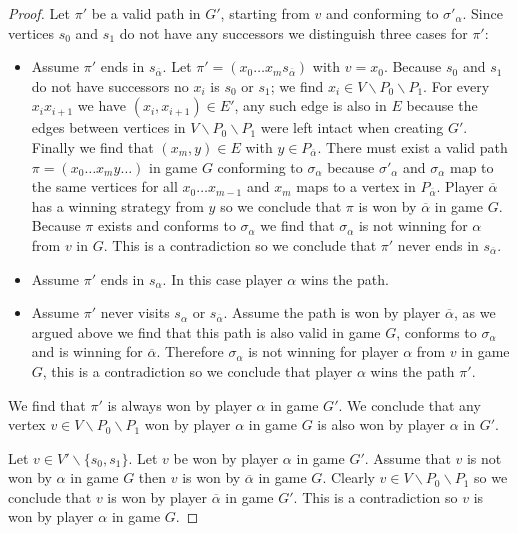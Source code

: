 \begin{lemma}
\begin{proof}
		Let $\pi'$ be a valid path in $G'$, starting from $v$ and conforming to $\sigma'_\alpha$. Since vertices $s_0$ and $s_1$ do not have any successors we distinguish three cases for $\pi'$:
		\begin{itemize}
			\item Assume $\pi'$ ends in $s_{\overline{\alpha}}$. Let $\pi' = (x_0\dots x_m s_{\overline{\alpha}})$ with $v = x_0$. Because $s_0$ and $s_1$ do not have successors no $x_i$ is $s_0$ or $s_1$; we find $x_i \in V\backslash P_0 \backslash P_1$. For every $x_ix_{i+1}$ we have $(x_i,x_{i+1}) \in E'$, any such edge is also in $E$ because the edges between vertices in $V\backslash P_0 \backslash P_1$ were left intact when creating $G'$. Finally we find that $(x_m,y) \in E$ with $y \in P_{\overline{\alpha}}$. There must exist a valid path $\pi = (x_0 \dots x_m y\dots)$ in game $G$ conforming to $\sigma_\alpha$ because $\sigma'_\alpha$ and $\sigma_\alpha$ map to the same vertices for all $x_0\dots x_{m-1}$ and $x_m$ maps to a vertex in $P_{\overline{\alpha}}$. Player $\overline{\alpha}$ has a winning strategy from $y$ so we conclude that $\pi$ is won by $\overline{\alpha}$ in game $G$. Because $\pi$ exists and conforms to $\sigma_\alpha$ we find that $\sigma_\alpha$ is not winning for $\alpha$ from $v$ in $G$. This is a contradiction so we conclude that $\pi'$ never ends in $s_{\overline{\alpha}}$.
			\item Assume $\pi'$ ends in $s_\alpha$. In this case player $\alpha$ wins the path.
			\item Assume $\pi'$ never visits $s_\alpha$ or $s_{\overline{\alpha}}$. Assume the path is won by player $\overline{\alpha}$, as we argued above we find that this path is also valid in game $G$, conforms to $\sigma_\alpha$ and is winning for $\overline{\alpha}$. Therefore $\sigma_\alpha$ is not winning for player $\alpha$ from $v$ in game $G$, this is a contradiction so we conclude that player ${\alpha}$ wins the path $\pi'$.
		\end{itemize}
		We find that $\pi'$ is always won by player $\alpha$ in game $G'$. We conclude that any vertex $v \in V \backslash P_0 \backslash P_1$ won by player $\alpha$ in game $G$ is also won by player $\alpha$ in $G'$. 
		
		Let $v \in V'\backslash \{s_0,s_1\}$. Let $v$ be won by player $\alpha$ in game $G'$. Assume that $v$ is not won by $\alpha$ in game $G$ then $v$ is won by $\overline{\alpha}$ in game $G$. Clearly $v \in V \backslash P_0 \backslash P_1$ so we conclude that $v$ is won by player $\overline{\alpha}$ in game $G'$. This is a contradiction so $v$ is won by player $\alpha$ in game $G$.
	\end{proof}
\end{lemma}

